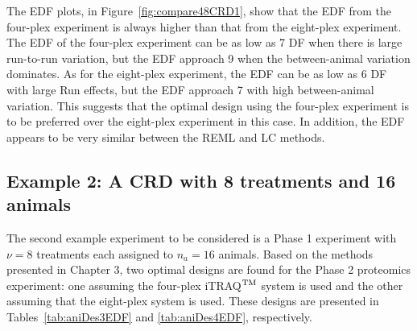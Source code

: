 The EDF plots, in Figure~\ref{fig:compare48CRD1}, show that the EDF from the four-plex experiment is always higher than that from the  eight-plex experiment. The EDF of the four-plex experiment can be as low as 7 DF when there is large run-to-run variation, but the EDF approach 9 when the between-animal variation dominates. As for the eight-plex experiment, the EDF can be as low as 6 DF with large Run effects, but the EDF approach 7 with high between-animal variation. This suggests that the optimal design using the four-plex experiment is to be preferred over the eight-plex experiment in this case. In addition, the EDF appears to be very similar between the REML and LC methods.

\subsection{Example 2: A CRD with 8 treatments and 16 animals}
The second example experiment to be considered is a Phase 1 experiment with $\nu = 8$ treatments each assigned to $n_a = 16$ animals. Based on the methods presented in Chapter 3, two optimal designs are found for the Phase 2 proteomics experiment: one assuming the four-plex iTRAQ$^{\rm TM}$ system is used and the other assuming that the eight-plex system is used. These designs are presented in Tables~\ref{tab:aniDes3EDF} and \ref{tab:aniDes4EDF}, respectively.

